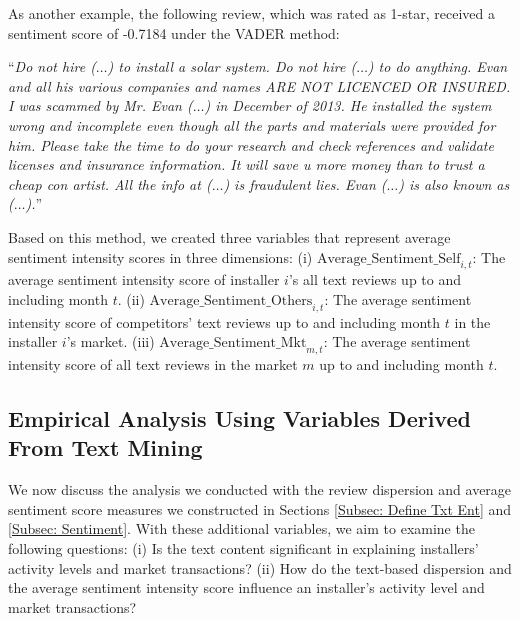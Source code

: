 \documentclass[msom,blindrev]{informs3}
\begin{document}
	As another example, the following review, which was rated as 1-star, received a sentiment score of -0.7184 under the VADER method:
	
	``\textit{Do not hire ($\ldots$)  to install a solar system. Do not hire ($\ldots$) to do anything. Evan and all his various companies and names  ARE NOT LICENCED OR INSURED. I was scammed by Mr. Evan ($\ldots$) in December of 2013. He installed the system wrong and incomplete even though all the parts and materials were provided for him. Please take the time to do your research and check references and validate licenses and insurance information. It will save u more money than to trust a cheap con artist. All the info at ($\ldots$)  is fraudulent lies. Evan ($\ldots$) is also known as ($\ldots$).}''
	
	Based on this method, we created three variables that represent average sentiment intensity scores in three dimensions: (i) $\text{Average\_Sentiment\_Self}_{i,t}$: The average sentiment intensity score of installer $i$'s all text reviews up to and including month $t$. (ii) $\text{Average\_Sentiment\_Others}_{i,t}$: The average sentiment intensity score of competitors' text reviews up to and including month $t$ in the installer $i$'s market. (iii) $\text{Average\_Sentiment\_Mkt}_{m,t}$: The average sentiment intensity score of all text reviews in the market $m$ up to and including month $t$.
	
	\subsection{Empirical Analysis Using Variables Derived From Text Mining}
	
	We now discuss the analysis we conducted with the review dispersion and average sentiment score measures we constructed in Sections \ref{Subsec: Define Txt Ent} and \ref{Subsec: Sentiment}. With these additional variables, we aim to examine the following questions: (i) Is the text content significant in explaining installers' activity levels and market transactions? (ii) How do the text-based dispersion and the average sentiment intensity score influence an installer's activity level and market transactions? %
	
	
	
	
\end{document}
